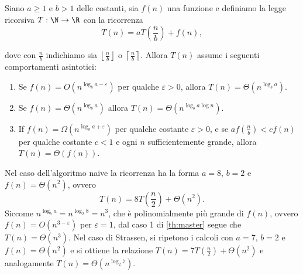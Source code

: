 \begin{theorem}
  \label{th:master}
  Siano $ a\ge 1 $ e $ b>1 $ delle costanti, sia $ f(n) $ una funzione e definiamo la legge
  ricorsiva $ T : \N \to \R $ con la ricorrenza
  \begin{equation*}
    T(n) = aT(\frac{n}{b}) + f(n),
  \end{equation*}
\end{theorem}
dove con $ \frac{n}{b} $ indichiamo sia $ \left\lfloor \frac{n}{b} \right\rfloor $ o $ \left\lceil
\frac{n}{b} \right\rceil  $. Allora $ T(n) $ assume i seguenti comportamenti asintotici: 
\begin{enumerate}
  \item Se $ f(n) = O(n^{\log_b a-\varepsilon}) $ per qualche $ \varepsilon >0 $, allora $ T(n) =
    \Theta(n^{\log_b a}) $.
  \item Se $ f(n) = \Theta(n^{\log_b a}) $ allora $ T(n) = \Theta(n^{\log_b a \log n}) $.
  \item If $ f(n) = \Omega(n^{\log_b a + \varepsilon}) $ per qualche costante $ \varepsilon >0 $, e
    se $ af(\frac{n}{b}) < cf(n) $ per qualche costante $ c<1$ e ogni $ n $ sufficientemente grande,
    allora $ T(n) = \Theta(f(n)) $.
\end{enumerate}

\begin{example}
  Nel caso dell'algoritmo naive la ricorrenza ha la forma $ a = 8 $, $ b = 2 $ e $ f(n) =
  \Theta(n^2) $, ovvero
  \begin{equation*}
    T(n) = 8T(\frac{n}{2}) + \Theta(n^2).
  \end{equation*}
  Siccome $ n^{\log_b a} = n^{\log_2 8} = n^3 $, che è polinomialmente più grande di $ f(n) $, ovvero $
  f(n) = O(n^{3-\varepsilon}) $ per $ \varepsilon = 1 $, dal caso 1 di \ref{th:master} segue che $
  T(n) = \Theta(n^3) $.
  Nel caso di Strassen, si ripetono i calcoli con $ a = 7 $, $ b=2 $ e $ f(n) = \Theta(n^2) $ e si
  ottiene la relazione $ T(n) = 7T(\frac{n}{2}) + \Theta(n^2)$ e analogamente $ T(n) =
  \Theta(n^{\log_2 7}) $.
\end{example}



